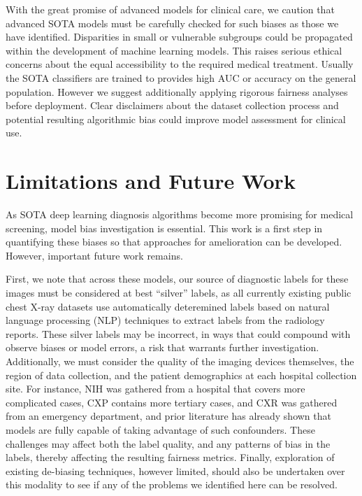 \documentclass{ws-procs11x85}
\begin{document}
With the great promise of advanced models for clinical care, we caution that advanced SOTA models must be carefully checked for such biases as those we have identified. Disparities in small or vulnerable subgroups could be propagated\cite{hashimoto_fairness_2018} within the development of machine learning models. This raises serious ethical concerns\cite{NEJMp1714229} about the equal accessibility to the required medical treatment. Usually the SOTA classifiers are trained to provides high AUC or accuracy on the general population. However we suggest additionally applying rigorous fairness analyses before deployment. Clear disclaimers about the dataset collection process and potential resulting algorithmic bias could improve model assessment for clinical use. 


\section{Limitations and Future Work}
\label{sec:Limitations and future work}


As SOTA deep learning diagnosis algorithms become more promising for medical screening, model bias investigation is essential. This work is a first step in quantifying these biases so that approaches for amelioration can be developed. However, important future work remains.

First, we note that across these models, our source of diagnostic labels for these images must be considered at best ``silver'' labels, as all currently existing public chest X-ray datasets use automatically deteremined labels based on natural language processing (NLP) techniques to extract labels from the radiology reports. These silver labels may be incorrect, in ways that could compound with observe biases or model errors, a risk that warrants further investigation. 
Additionally, we must consider the quality of the imaging devices themselves, the region of data collection, and the patient demographics at each hospital collection site. For instance, NIH was gathered from a hospital that covers more complicated cases, CXP contains more tertiary cases, and CXR was gathered from an emergency department, and prior literature has already shown that models are fully capable of taking advantage of such confounders.\cite{zech_confounding_2018} These challenges may affect both the label quality,\cite{lukeoakdenrayner_half_2019} and any patterns of bias in the labels, thereby affecting the resulting fairness metrics. Finally, exploration of existing de-biasing techniques, however limited, should also be undertaken over this modality to see if any of the problems we identified here can be resolved.
\end{document}
